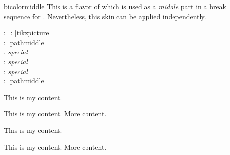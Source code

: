 \clearpage
\begin{docSkin}{bicolormiddle}
This is a flavor of  which is used as a \emph{middle} part
in a break sequence for .
Nevertheless, this skin can be applied independently.
\begin{tcolorbox}[skintable=bicolormiddle]
  \begin{tabbing}
    : \=\kill
    :  \> |tikzpicture|\\ 
    :           \> |pathmiddle|\\
    : \> \emph{special}\\ 
    :        \> \emph{special}\\
    :    \> \emph{special}\\
    :           \> |pathmiddle|
  \end{tabbing}
\end{tcolorbox}
\end{docSkin}


\begin{dispExample}
\begin{tcbraster}[skin=bicolormiddle,raster equal height,raster columns=4,
    colback=LightGreen,colframe=DarkGreen,colbacklower=LimeGreen!75!LightGreen,
    colbacktitle=LimeGreen!75!DarkGreen,
    left=1mm,right=1mm,top=1mm,bottom=1mm,middle=1mm]
  \begin{tcolorbox}
    This is my content.
  \end{tcolorbox}
  \begin{tcolorbox}
    This is my content.
    \tcblower
    More content.
  \end{tcolorbox}
  \begin{tcolorbox}[adjusted title=My title]
    This is my content.
  \end{tcolorbox}
  \begin{tcolorbox}[adjusted title=My title]
    This is my content.
    \tcblower
    More content.
  \end{tcolorbox}
\end{tcbraster}
\end{dispExample}


